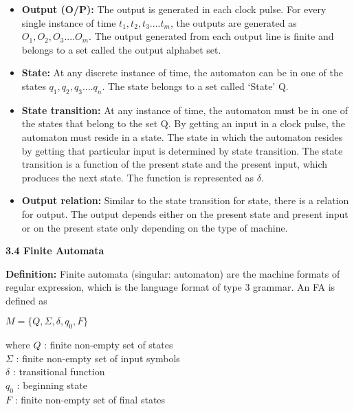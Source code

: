 \documentclass{article}
\begin{document}
\begin{itemize}
  \item \textbf{Output (O/P):} The output is generated in each clock pulse. For every single instance of time $t_{1}, t_{2},
t_{3} .... t_{m}$, the outputs are generated as $O_{1}, O_{2}, O_{3} .... O_{m}$. The output generated from each output
line is finite and belongs to a set called the output alphabet set.\\
  \item \textbf{State:} At any discrete instance of time, the automaton can be in one of the states $q_{1}, q_{2}, q_{3} .... q_{n}$.
The state belongs to a set called ‘State’ Q.\\
  \item \textbf{State transition:} At any instance of time, the automaton must be in one of the states that belong
to the set Q. By getting an input in a clock pulse, the automaton must reside in a state. The state in
which the automaton resides by getting that particular input is determined by state transition. The
state transition is a function of the present state and the present input, which produces the next state.
The function is represented as $\delta$.\\
  \item \textbf{Output relation:} Similar to the state transition for state, there is a relation for output. The output
depends either on the present state and present input or on the present state only depending on the
type of machine.\\
\end{itemize}

\vspace*{0.4cm}

\large{
\textbf{3.4 Finite Automata}\\
}

\vspace*{0.2cm}
\textbf{Definition:} Finite automata (singular: automaton) are the machine formats of regular expression, which
is the language format of type 3 grammar. An FA is defined as\\
\begin{center}
  $M = \{Q, \Sigma, \delta, q_{0}, F\}$ \\
\end{center}

\vspace*{0.2cm}
where \hspace*{0.5cm} $Q$ : finite non-empty set of states\\
\hspace*{1.3cm} $\Sigma$ : finite non-empty set of input symbols\\
\hspace*{1.3cm} $\delta$ : transitional function\\
\hspace*{1.3cm} $q_{0}$ : beginning state\\
\hspace*{1.3cm} $F$ : finite non-empty set of final states\\
\end{document}
